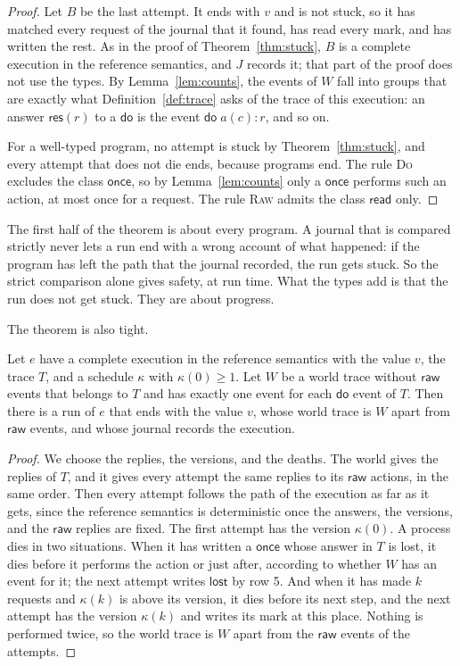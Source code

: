 \documentclass[acmsmall,nonacm,screen]{acmart}
\newcommand{\kw}[1]{\mathsf{#1}}
\newcommand{\res}[1]{\kw{res}(#1)}
\newcommand{\lost}{\kw{lost}}
\newcommand{\rd}{\kw{read}}
\newcommand{\onceclass}{\kw{once}}
\begin{document}
\begin{proof}
Let $B$ be the last attempt. It ends with $v$ and is not stuck, so it has matched every
request of the journal that it found, has read every mark, and has written the rest. As in
the proof of Theorem~\ref{thm:stuck}, $B$ is a complete execution in the reference semantics,
and $J$ records it; that part of the proof does not use the types. By
Lemma~\ref{lem:counts}, the events of $W$ fall into groups that are exactly what
Definition~\ref{def:trace} asks of the trace of this execution: an answer $\res{r}$ to a
$\kw{do}$ is the event $\kw{do}\;a(c){:}r$, and so on.

For a well-typed program, no attempt is stuck by Theorem~\ref{thm:stuck}, and every attempt
that does not die ends, because programs end. The rule \textsc{Do} excludes the class
$\onceclass$, so by Lemma~\ref{lem:counts} only a $\kw{once}$ performs such an action, at most
once for a request. The rule \textsc{Raw} admits the class $\rd$ only.
\end{proof}

The first half of the theorem is about every program. A journal that is compared strictly
never lets a run end with a wrong account of what happened: if the program has left the path
that the journal recorded, the run gets stuck. So the strict comparison alone gives safety,
at run time. What the types add is that the run does not get stuck. They are about progress.

The theorem is also tight.

\begin{theorem}
\label{thm:complete}
Let $e$ have a complete execution in the reference semantics with the value $v$, the trace
$T$, and a schedule $\kappa$ with $\kappa(0) \ge 1$. Let $W$ be a world trace without
$\kw{raw}$ events that belongs to $T$ and has exactly one event for each $\kw{do}$ event of
$T$. Then there is a run of $e$ that ends with the value $v$, whose world trace is $W$ apart
from $\kw{raw}$ events, and whose journal records the execution.
\end{theorem}

\begin{proof}
We choose the replies, the versions, and the deaths. The world gives the replies of $T$, and
it gives every attempt the same replies to its $\kw{raw}$ actions, in the same order. Then
every attempt follows the path of the execution as far as it gets, since the reference
semantics is deterministic once the answers, the versions, and the $\kw{raw}$ replies are
fixed. The first attempt has the version $\kappa(0)$. A process dies in two situations. When
it has written a $\kw{once}$ whose answer in $T$ is lost, it dies before it performs the
action or just after, according to whether $W$ has an event for it; the next attempt writes
$\lost$ by row 5. And when it has made $k$ requests and $\kappa(k)$ is above its version, it
dies before its next step, and the next attempt has the version $\kappa(k)$ and writes its
mark at this place. Nothing is performed twice, so the world trace is $W$ apart from the
$\kw{raw}$ events of the attempts.
\end{proof}
\end{document}
